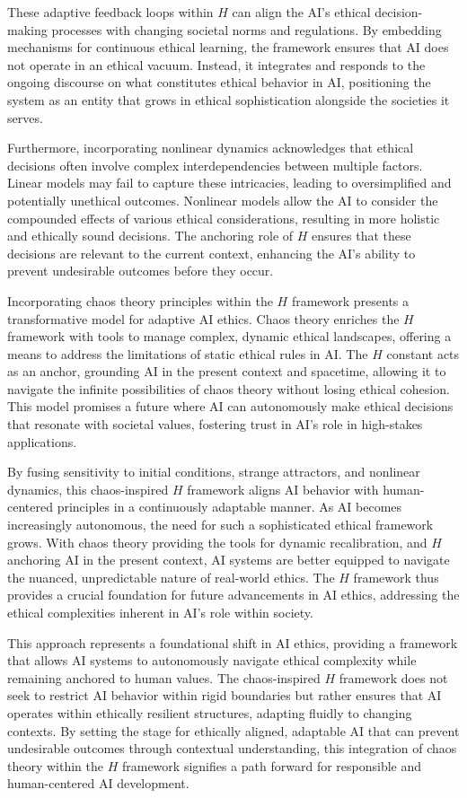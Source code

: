 \documentclass[12pt]{article}
\begin{document}
These adaptive feedback loops within \(H\) can align the AI's ethical decision-making processes with changing societal norms and regulations. By embedding mechanisms for continuous ethical learning, the framework ensures that AI does not operate in an ethical vacuum. Instead, it integrates and responds to the ongoing discourse on what constitutes ethical behavior in AI, positioning the system as an entity that grows in ethical sophistication alongside the societies it serves.

Furthermore, incorporating nonlinear dynamics acknowledges that ethical decisions often involve complex interdependencies between multiple factors. Linear models may fail to capture these intricacies, leading to oversimplified and potentially unethical outcomes. Nonlinear models allow the AI to consider the compounded effects of various ethical considerations, resulting in more holistic and ethically sound decisions. The anchoring role of \(H\) ensures that these decisions are relevant to the current context, enhancing the AI's ability to prevent undesirable outcomes before they occur.

Incorporating chaos theory principles within the \(H\) framework presents a transformative model for adaptive AI ethics. Chaos theory enriches the \(H\) framework with tools to manage complex, dynamic ethical landscapes, offering a means to address the limitations of static ethical rules in AI. The \(H\) constant acts as an anchor, grounding AI in the present context and spacetime, allowing it to navigate the infinite possibilities of chaos theory without losing ethical cohesion. This model promises a future where AI can autonomously make ethical decisions that resonate with societal values, fostering trust in AI’s role in high-stakes applications.

By fusing sensitivity to initial conditions, strange attractors, and nonlinear dynamics, this chaos-inspired \(H\) framework aligns AI behavior with human-centered principles in a continuously adaptable manner. As AI becomes increasingly autonomous, the need for such a sophisticated ethical framework grows. With chaos theory providing the tools for dynamic recalibration, and \(H\) anchoring AI in the present context, AI systems are better equipped to navigate the nuanced, unpredictable nature of real-world ethics. The \(H\) framework thus provides a crucial foundation for future advancements in AI ethics, addressing the ethical complexities inherent in AI's role within society.

This approach represents a foundational shift in AI ethics, providing a framework that allows AI systems to autonomously navigate ethical complexity while remaining anchored to human values. The chaos-inspired \(H\) framework does not seek to restrict AI behavior within rigid boundaries but rather ensures that AI operates within ethically resilient structures, adapting fluidly to changing contexts. By setting the stage for ethically aligned, adaptable AI that can prevent undesirable outcomes through contextual understanding, this integration of chaos theory within the \(H\) framework signifies a path forward for responsible and human-centered AI development.
\end{document}
